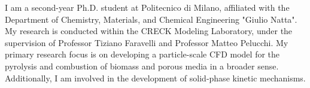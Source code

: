 I am a second-year Ph.D. student at Politecnico di Milano, affiliated with the Department of Chemistry, Materials, and Chemical Engineering "Giulio Natta". My research is conducted within the CRECK Modeling Laboratory, under the supervision of Professor Tiziano Faravelli and Professor Matteo Pelucchi. My primary research focus is on developing a particle-scale CFD model for the pyrolysis and combustion of biomass and porous media in a broader sense. Additionally, I am involved in the development of solid-phase kinetic mechanisms.
